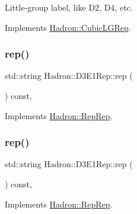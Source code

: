 Little-\/group label, like D2, D4, etc. 

Implements \mbox{\hyperlink{structHadron_1_1CubicLGRep_a9bdb14b519a611d21379ed96a3a9eb41}{Hadron\+::\+Cubic\+L\+G\+Rep}}.

\mbox{\label{structHadron_1_1D3E1Rep_a31b989d15d93cd4e876bfabd809b84ee}} 
\subsubsection{\texorpdfstring{rep()}{rep()}\hspace{0.1cm}{\footnotesize\ttfamily [1/5]}}
{\footnotesize\ttfamily std\+::string Hadron\+::\+D3\+E1\+Rep\+::rep (\begin{DoxyParamCaption}{ }\end{DoxyParamCaption}) const\hspace{0.3cm}{\ttfamily [inline]}, {\ttfamily [virtual]}}



Implements \mbox{\hyperlink{structHadron_1_1RepRep_ab3213025f6de249f7095892109575fde}{Hadron\+::\+Rep\+Rep}}.

\mbox{\label{structHadron_1_1D3E1Rep_a31b989d15d93cd4e876bfabd809b84ee}} 
\subsubsection{\texorpdfstring{rep()}{rep()}\hspace{0.1cm}{\footnotesize\ttfamily [2/5]}}
{\footnotesize\ttfamily std\+::string Hadron\+::\+D3\+E1\+Rep\+::rep (\begin{DoxyParamCaption}{ }\end{DoxyParamCaption}) const\hspace{0.3cm}{\ttfamily [inline]}, {\ttfamily [virtual]}}



Implements \mbox{\hyperlink{structHadron_1_1RepRep_ab3213025f6de249f7095892109575fde}{Hadron\+::\+Rep\+Rep}}.

\mbox{\label{structHadron_1_1D3E1Rep_a31b989d15d93cd4e876bfabd809b84ee}} 

